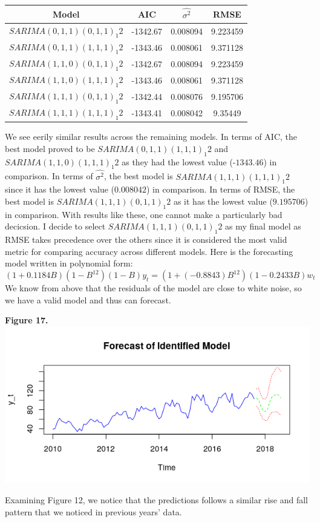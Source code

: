 \documentclass[11pt]{article}
\begin{document}
\begin{table}[h]
\centering
\begin{tabular}{|c|c|c|c|}
\hline
Model   & AIC     & $\hat{\sigma^2}$ & RMSE     \\
\hline
$SARIMA(0,1,1)(0,1,1)_1 2$ & -1342.67 & 0.008094                              & 9.223459  \\
\hline
$SARIMA(0,1,1)(1,1,1)_1 2$ & -1343.46 & 0.008061                              & 9.371128 \\
\hline
$SARIMA(1,1,0)(0,1,1)_1 2$ & -1342.67 & 0.008094                              & 9.223459 \\
\hline
$SARIMA(1,1,0)(1,1,1)_1 2$ & -1343.46 & 0.008061                              & 9.371128 \\
\hline
$SARIMA(1,1,1)(0,1,1)_1 2$ & -1342.44 & 0.008076                              & 9.195706 \\
\hline
$SARIMA(1,1,1)(1,1,1)_1 2$ & -1343.41 & 0.008042                              & 9.35449 \\
\hline
\end{tabular}
\end{table}
We see eerily similar results across the remaining models. In terms of AIC, the best model proved to be $SARIMA(0,1,1)(1,1,1)_1 2$ and $SARIMA(1,1,0)(1,1,1)_1 2$ as they had the lowest value (-$1343.46$) in comparison. In terms of $\hat{\sigma^2}$, the best model is $SARIMA(1,1,1)(1,1,1)_1 2$ since it has the lowest value ($0.008042$) in comparison. In terms of RMSE, the best model is $SARIMA(1,1,1)(0,1,1)_1 2$ as it has the lowest value ($9.195706$) in comparison. With results like these, one cannot make a particularly bad decicsion. I decide to select $SARIMA(1,1,1)(0,1,1)_1 2$ as my final model as RMSE takes precedence over the others since it is considered the most valid metric for comparing accuracy across different models. Here is the forecasting model written in polynomial form:
$$ (1 + 0.1184B)(1 - B^{12})(1 - B)y_t = (1 + (-0.8843)B^{12})(1 - 0.2433B)w_t $$
We know from above that the residuals of the model are close to white noise, so we have a valid model and thus can forecast. 
\begin{center}
\textbf{Figure 17.}
\\
\includegraphics[scale=1]{for1}
\end{center}
Examining Figure 12, we notice that the predictions follows a similar rise and fall pattern that we noticed in previous years' data.
\end{document}
